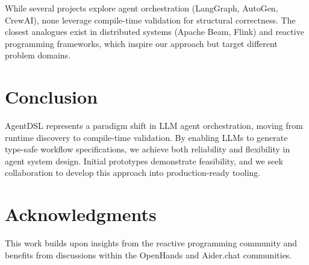 \documentclass[11pt,a4paper]{article}
\begin{document}
While several projects explore agent orchestration (LangGraph, AutoGen, CrewAI), none leverage compile-time validation for structural correctness. The closest analogues exist in distributed systems (Apache Beam, Flink) and reactive programming frameworks, which inspire our approach but target different problem domains.

\section{Conclusion}

AgentDSL represents a paradigm shift in LLM agent orchestration, moving from runtime discovery to compile-time validation. By enabling LLMs to generate type-safe workflow specifications, we achieve both reliability and flexibility in agent system design. Initial prototypes demonstrate feasibility, and we seek collaboration to develop this approach into production-ready tooling.

\section{Acknowledgments}

This work builds upon insights from the reactive programming community and benefits from discussions within the OpenHands and Aider.chat communities.



\end{document}
